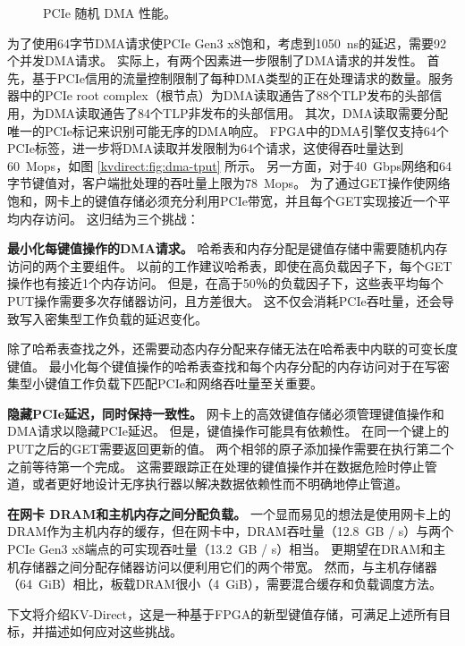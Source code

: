 \begin{figure}[t]
	\centering
	\caption{PCIe 随机 DMA 性能。}
	\label{kvdirect:fig:dma-perf}
\end{figure}

为了使用64字节DMA请求使PCIe Gen3 x8饱和，考虑到1050~ns的延迟，需要92个并发DMA请求。
实际上，有两个因素进一步限制了DMA请求的并发性。
首先，基于PCIe信用的流量控制限制了每种DMA类型的正在处理请求的数量。服务器中的PCIe root complex（根节点）为DMA读取通告了88个TLP发布的头部信用，为DMA读取通告了84个TLP非发布的头部信用。
其次，DMA读取需要分配唯一的PCIe标记来识别可能无序的DMA响应。
FPGA中的DMA引擎仅支持64个PCIe标签，进一步将DMA读取并发限制为64个请求，这使得吞吐量达到60~Mops，如图 \ref {kvdirect:fig:dma-tput} 所示。
另一方面，对于40~Gbps网络和64字节键值对，客户端批处理的吞吐量上限为78~Mops。
为了通过GET操作使网络饱和，网卡上的键值存储必须充分利用PCIe带宽，并且每个GET实现接近一个平均内存访问。
这归结为三个挑战：

\textbf {最小化每键值操作的DMA请求。}
哈希表和内存分配是键值存储中需要随机内存访问的两个主要组件。
以前的工作建议哈希表\cite {dragojevic2014farm,breslow2016horton}，即使在高负载因子下，每个GET操作也有接近1个内存访问。
但是，在高于50％的负载因子下，这些表平均每个PUT操作需要多次存储器访问，且方差很大。
这不仅会消耗PCIe吞吐量，还会导致写入密集型工作负载的延迟变化。

除了哈希表查找之外，还需要动态内存分配来存储无法在哈希表中内联的可变长度键值。
最小化每个键值操作的哈希表查找和每个内存分配的内存访问对于在写密集型小键值工作负载下匹配PCIe和网络吞吐量至关重要。

\textbf {隐藏PCIe延迟，同时保持一致性。}
网卡上的高效键值存储必须管理键值操作和DMA请求以隐藏PCIe延迟。
但是，键值操作可能具有依赖性。
在同一个键上的PUT之后的GET需要返回更新的值。
两个相邻的原子添加操作需要在执行第二个之前等待第一个完成。
这需要跟踪正在处理的键值操作并在数据危险时停止管道，或者更好地设计无序执行器以解决数据依赖性而不明确地停止管道。


\textbf {在网卡 DRAM和主机内存之间分配负载。}
一个显而易见的想法是使用网卡上的DRAM作为主机内存的缓存，但在网卡中，DRAM吞吐量（12.8~GB / s）与两个PCIe Gen3 x8端点的可实现吞吐量（13.2~GB / s）相当。 
更期望在DRAM和主机存储器之间分配存储器访问以便利用它们的两个带宽。
然而，与主机存储器（64~GiB）相比，板载DRAM很小（4~GiB），需要混合缓存和负载调度方法。

下文将介绍KV-Direct，这是一种基于FPGA的新型键值存储，可满足上述所有目标，并描述如何应对这些挑战。
